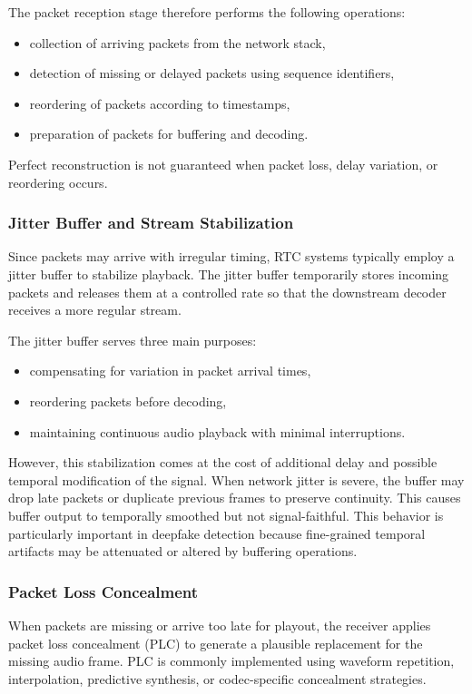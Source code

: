 The packet reception stage therefore performs the following operations:
\begin{itemize}
    \item collection of arriving packets from the network stack,
    \item detection of missing or delayed packets using sequence identifiers,
    \item reordering of packets according to timestamps,
    \item preparation of packets for buffering and decoding.
\end{itemize}

Perfect reconstruction is not guaranteed when packet loss, delay variation, or reordering occurs.

\subsubsection{Jitter Buffer and Stream Stabilization}

Since packets may arrive with irregular timing, RTC systems typically employ a jitter buffer to stabilize playback. The jitter buffer temporarily stores incoming packets and releases them at a controlled rate so that the downstream decoder receives a more regular stream.

The jitter buffer serves three main purposes:
\begin{itemize}
    \item compensating for variation in packet arrival times,
    \item reordering packets before decoding,
    \item maintaining continuous audio playback with minimal interruptions.
\end{itemize}

However, this stabilization comes at the cost of additional delay and possible temporal modification of the signal. When network jitter is severe, the buffer may drop late packets or duplicate previous frames to preserve continuity. This causes buffer output to temporally smoothed but not signal-faithful. This behavior is particularly important in deepfake detection because fine-grained temporal artifacts may be attenuated or altered by buffering operations.

\subsubsection{Packet Loss Concealment}

When packets are missing or arrive too late for playout, the receiver applies packet loss concealment (PLC) to generate a plausible replacement for the missing audio frame. PLC is commonly implemented using waveform repetition, interpolation, predictive synthesis, or codec-specific concealment strategies.

